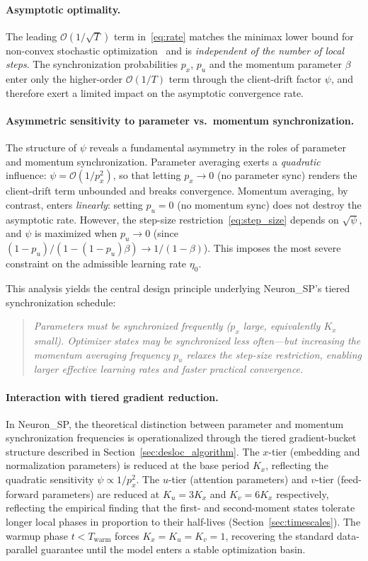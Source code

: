 \documentclass{article}
\begin{document}
\paragraph{Asymptotic optimality.}
The leading $\mathcal{O}(1/\sqrt{T})$ term in~\eqref{eq:rate} matches the
minimax lower bound for non-convex stochastic
optimization~\citep{arjevani2023lower} and is \emph{independent of the
number of local steps}. The synchronization probabilities $p_x$, $p_u$
and the momentum parameter $\beta$ enter only the higher-order
$\mathcal{O}(1/T)$ term through the client-drift factor $\psi$, and
therefore exert a limited impact on the asymptotic convergence rate.

\paragraph{Asymmetric sensitivity to parameter vs.\ momentum synchronization.}
The structure of $\psi$ reveals a fundamental asymmetry in the roles of
parameter and momentum synchronization.
Parameter averaging exerts a \emph{quadratic} influence:
$\psi = \mathcal{O}(1/p_x^2)$, so that letting $p_x \to 0$ (no parameter
sync) renders the client-drift term unbounded and breaks convergence.
Momentum averaging, by contrast, enters \emph{linearly}: setting $p_u = 0$
(no momentum sync) does not destroy the asymptotic rate. However,
the step-size restriction~\eqref{eq:step_size} depends on $\sqrt{\psi}$,
and $\psi$ is maximized when $p_u \to 0$
(since $(1-p_u)/(1-(1-p_u)\beta) \to 1/(1-\beta)$). This imposes
the most severe constraint on the admissible learning rate $\eta_0$.

This analysis yields the central design principle underlying Neuron\_SP's
tiered synchronization schedule:
\begin{quote}
\emph{Parameters must be synchronized frequently ($p_x$ large, equivalently
$K_x$ small). Optimizer states may be synchronized less often---but
increasing the momentum averaging frequency $p_u$ relaxes the step-size
restriction, enabling larger effective learning rates and faster
practical convergence.}
\end{quote}

\paragraph{Interaction with tiered gradient reduction.}
In Neuron\_SP, the theoretical distinction between parameter and
momentum synchronization frequencies is operationalized through
the tiered gradient-bucket structure described in
Section~\ref{sec:desloc_algorithm}. The $x$-tier (embedding and
normalization parameters) is reduced at the base period $K_x$,
reflecting the quadratic sensitivity $\psi \propto 1/p_x^2$.
The $u$-tier (attention parameters) and $v$-tier (feed-forward
parameters) are reduced at $K_u = 3K_x$ and $K_v = 6K_x$
respectively, reflecting the empirical finding that the first- and
second-moment states tolerate longer local phases in proportion to
their half-lives (Section~\ref{sec:timescales}). The warmup phase
$t < T_{\mathrm{warm}}$ forces $K_x = K_u = K_v = 1$, recovering
the standard data-parallel guarantee until the model enters a
stable optimization basin.
\end{document}
